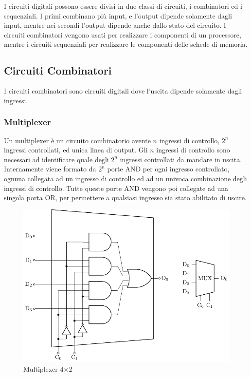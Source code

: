\documentclass{article}
\numberwithin{equation}{subsection}
\begin{document}
I circuiti digitali possono essere divisi in due classi di circuiti, i combinatori ed i sequenziali. I primi combinano più input, e l'output dipende solamente dagli input, mentre nei secondi l'output dipende 
anche dallo stato del circuito. I circuiti combinatori vengono usati per realizzare i componenti di un processore, mentre i circuiti sequenziali per realizzare le componenti delle schede di memoria. 

\subsection{Circuiti Combinatori}

I circuiti combinatori sono circuiti digitali dove l'uscita dipende solamente dagli ingressi. 

\subsubsection{Multiplexer}

Un multiplexer è un circuito combinatorio avente $n$ ingressi di controllo, $2^n$ ingressi controllati, ed unica linea di output. Gli $n$ ingressi di controllo sono necessari ad identificare quale degli $2^n$ 
ingressi controllati da mandare in uscita. Internamente viene formato da $2^n$ porte AND per ogni ingresso controllato, ognuna collegata ad un ingresso di controllo ed ad un univoca combinazione degli 
ingressi di controllo. Tutte queste porte AND vengono poi collegate ad una singola porta OR, per permettere a qualsiasi ingresso sia stato abilitato di uscire. 

\begin{figure}[H]%
    \centering%
    \includegraphics{multiplexer-2x4.pdf}%
    \caption{Multiplexer 4$\times$2}%
\end{figure}
\end{document}
